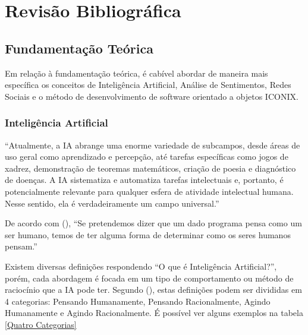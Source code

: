 \documentclass[
	12pt,				%
	openright,			%
	oneside,			%
	a4paper,			%
	english,			%
	spanish,			%
	brazil				%
	]{abntex2}
\begin{document}
\chapter{Revisão Bibliográfica}				


\section{Fundamentação Teórica}
	
	Em relação à fundamentação teórica, é cabível abordar de maneira mais específica os conceitos de Inteligência Artificial, Análise de Sentimentos, Redes Sociais e o método de desenvolvimento de software orientado a objetos ICONIX.

	\subsection{Inteligência Artificial}	
	\begin{citacao} ``Atualmente, a IA abrange uma enorme variedade de subcampos, desde áreas de uso geral como aprendizado e percepção, até tarefas específicas como jogos de xadrez, demonstração de teoremas matemáticos, criação de poesia e diagnóstico de doenças. A IA sistematiza e automatiza tarefas intelectuais e, portanto, é potencialmente relevante para qualquer esfera de atividade intelectual humana. Nesse sentido, ela é verdadeiramente um campo universal.'' \cite{norvig3rd}
	\end{citacao}

	De acordo com  (\citeyear{norvig3rd}), ``Se pretendemos dizer que um dado programa pensa como um ser humano, temos de ter alguma forma de determinar como os seres humanos pensam.''
	
	Existem diversas definições respondendo ``O que é Inteligência Artificial?'', porém, cada abordagem é focada em um tipo de comportamento ou método de raciocínio que a IA pode ter. Segundo  (\citeyear{norvig3rd}), estas definições podem ser divididas em 4 categorias: Pensando Humanamente, Pensando Racionalmente, Agindo Humanamente e Agindo Racionalmente. É possível ver alguns exemplos na tabela \ref{Quatro Categorias}
	
\end{document}
